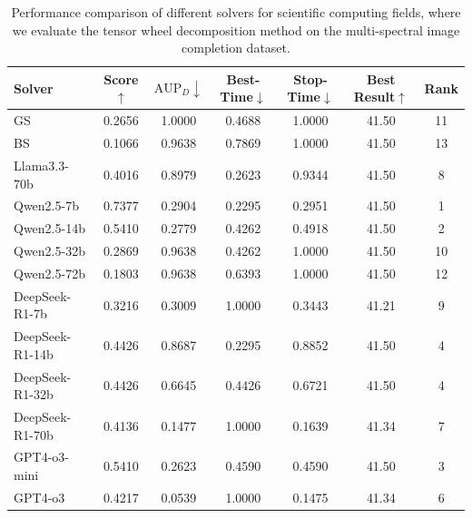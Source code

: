 \begin{table}[h]
    \centering
    \setlength{\tabcolsep}{3pt}
    \renewcommand\arraystretch{1.5}
    \caption{Performance comparison of different solvers for scientific computing fields, where we evaluate the tensor wheel decomposition method on the multi-spectral image completion dataset.}
    \begin{tabular}{l|cccccc}
    \toprule
    Solver           & Score$\uparrow$ & $\text{AUP}_D\downarrow$ & Best-Time$\downarrow$ & Stop-Time$\downarrow$ & Best Result$\uparrow$ & Rank \\
    \midrule
    GS & 0.2656 & 1.0000 & 0.4688 & 1.0000 & 41.50 & 11 \\
    BS & 0.1066 & 0.9638 & 0.7869 & 1.0000 & 41.50 & 13 \\
    Llama3.3-70b & 0.4016 & 0.8979 & 0.2623 & 0.9344 & 41.50 & 8 \\
    Qwen2.5-7b & 0.7377 & 0.2904 & 0.2295 & 0.2951 & 41.50 & 1 \\
    Qwen2.5-14b & 0.5410 & 0.2779 & 0.4262 & 0.4918 & 41.50 & 2 \\
    Qwen2.5-32b & 0.2869 & 0.9638 & 0.4262 & 1.0000 & 41.50 & 10 \\
    Qwen2.5-72b & 0.1803 & 0.9638 & 0.6393 & 1.0000 & 41.50 & 12 \\
    DeepSeek-R1-7b & 0.3216 & 0.3009 & 1.0000 & 0.3443 & 41.21 & 9 \\
    DeepSeek-R1-14b & 0.4426 & 0.8687 & 0.2295 & 0.8852 & 41.50 & 4 \\
    DeepSeek-R1-32b & 0.4426 & 0.6645 & 0.4426 & 0.6721 & 41.50 & 4 \\
    DeepSeek-R1-70b & 0.4136 & 0.1477 & 1.0000 & 0.1639 & 41.34 & 7 \\
    GPT4-o3-mini & 0.5410 & 0.2623 & 0.4590 & 0.4590 & 41.50 & 3 \\
    GPT4-o3 & 0.4217 & 0.0539 & 1.0000 & 0.1475 & 41.34 & 6 \\
    \bottomrule
    \end{tabular}
    \label{tab:TW}
\end{table}

